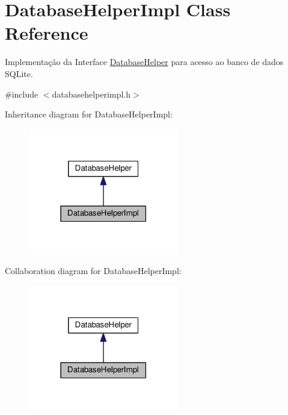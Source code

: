 \hypertarget{classDatabaseHelperImpl}{}\section{Database\+Helper\+Impl Class Reference}
\label{classDatabaseHelperImpl}


Implementação da Interface \hyperlink{classDatabaseHelper}{Database\+Helper} para acesso ao banco de dados S\+Q\+Lite.  




{\ttfamily \#include $<$databasehelperimpl.\+h$>$}



Inheritance diagram for Database\+Helper\+Impl\+:
\nopagebreak
\begin{figure}[H]
\begin{center}
\leavevmode
\includegraphics[width=186pt]{dd/d1d/classDatabaseHelperImpl__inherit__graph}
\end{center}
\end{figure}


Collaboration diagram for Database\+Helper\+Impl\+:
\nopagebreak
\begin{figure}[H]
\begin{center}
\leavevmode
\includegraphics[width=186pt]{d8/da4/classDatabaseHelperImpl__coll__graph}
\end{center}
\end{figure}
